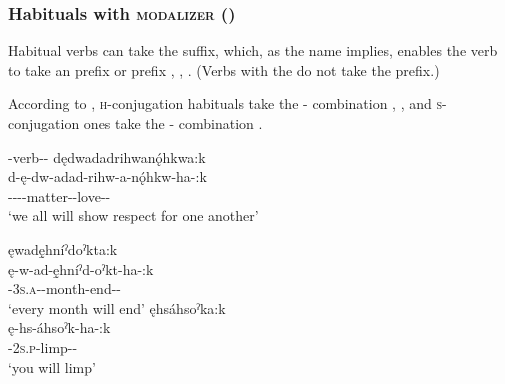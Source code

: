 \subsubsection{Habituals with  \textsc{modalizer} ({\modalizer})} \label{Habituals with [-:k] modalizer}
Habitual verbs can take the  {\modalizer} suffix, which, as the name implies, enables the verb to take an  {\future} prefix  or  \textsc{\indefinite} prefix , , .  (Verbs with the  {\modalizer} do not take the  \textsc{\factual} prefix.)

According to \citet{sasse_far_1998}, \textsc{h}-conjugation habituals take the  \textsc{\habitual-\modalizer} combination , , and \textsc{s}-conjugation ones take the  \textsc{\habitual-\modalizer} combination .

\ea\label{ex:habitvarex4}  \exsc{\future}-verb-{\habitual}-{\modalizer}
\ea dędwadadrihwanǫ́hkwa:k\\
\gll d-ę-dw-adad-rihw-a-nǫ́hkw-ha-:k\\
 {\dualic}-{\future}--{}-matter-{\joinerA}-love-{\habitual}-{\modalizer}\\
\glt `we all will show respect for one another'

\ex ęwadę̱hníˀdoˀkta:k\\
\gll ę-w-ad-ę̱hníˀd-oˀkt-ha-:k\\
 \fut-\textsc{3s.a}-{\semireflexive}-month-end-{\habitual}-{\modalizer}\\
\glt `every month will end'
\ex ęhsáhsoˀka:k\\
\gll ę-hs-áhsoˀk-ha-:k\\
 \fut-\textsc{2s.p}-limp-{\habitual}-{\modalizer}\\
\glt `you will limp'
\z
\z
 
